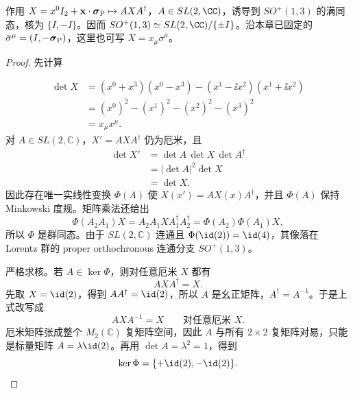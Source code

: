 \begin{theorem}
作用 $X=x^0I_2+\mathbf x\cdot\boldsymbol\sigma_{\rm P}\mapsto AXA^\dagger$，$A\in SL(2,\CC)$，诱导到 $SO^+(1,3)$ 的满同态，核为 $\{I,-I\}$。因而 $SO^+(1,3)\simeq SL(2,\CC)/\{\pm I\}$。沿本章已固定的 $\bar\sigma^\mu=(I,-\boldsymbol\sigma_{\rm P})$，这里也可写 $X=x_\mu\bar\sigma^\mu$。
\end{theorem}
\begin{proof}
先计算

\begin{align*}
 \det X
 &=(x^0+x^3)(x^0-x^3)
 -(x^1-\ii x^2)(x^1+\ii x^2)\\
 &=(x^0)^2-(x^1)^2-(x^2)^2-(x^3)^2\\
 &=x_\mu x^\mu.
\end{align*}
对 $A\in SL(2,\mathbb C)$，$X'=AXA^\dagger$ 仍为厄米，且
\begin{align*}
 \det X'
 &=\det A\,\det X\,\det A^\dagger\\
 &=|\det A|^2\det X\\
 &=\det X.
\end{align*}
因此存在唯一实线性变换 $\Phi(A)$ 使 $X(x')=AX(x)A^\dagger$，并且 $\Phi(A)$ 保持 Minkowski 度规。矩阵乘法还给出
\begin{equation*}
 \Phi(A_2A_1)X
 =A_2A_1X A_1^\dagger A_2^\dagger
 =\Phi(A_2)\Phi(A_1)X,
\end{equation*}
所以 $\Phi$ 是群同态。由于 $SL(2,\mathbb C)$ 连通且 $\Phi(\id(2))=\id(4)$，其像落在 Lorentz 群的 proper orthochronous 连通分支 $SO^+(1,3)$。

严格求核。若 $A\in\ker\Phi$，则对任意厄米 $X$ 都有
\begin{equation*}
 AXA^\dagger=X.
\end{equation*}
先取 $X=\id(2)$，得到 $AA^\dagger=\id(2)$，所以 $A$ 是幺正矩阵，$A^\dagger=A^{-1}$。于是上式改写成
\begin{equation*}
 AXA^{-1}=X
 \qquad\text{对任意厄米 }X.
\end{equation*}
厄米矩阵张成整个 $M_2(\mathbb C)$ 复矩阵空间，因此 $A$ 与所有 $2\times2$ 复矩阵对易，只能是标量矩阵 $A=\lambda\id(2)$。再用 $\det A=\lambda^2=1$，得到
\begin{equation*}
 \ker\Phi=\{+\id(2),-\id(2)\}.
\end{equation*}


\end{proof}
